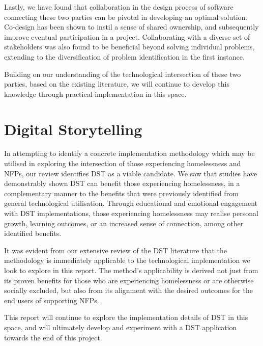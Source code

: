 Lastly, we have found that collaboration in the design process of software connecting these two parties can be pivotal in developing an optimal solution. Co-design has been shown to instil a sense of shared ownership, and subsequently improve eventual participation in a project. Collaborating with a diverse set of stakeholders was also found to be beneficial beyond solving individual problems, extending to the diversification of problem identification in the first instance.

Building on our understanding of the technological intersection of these two parties, based on the existing literature, we will continue to develop this knowledge through practical implementation in this space.

\section{Digital Storytelling}

In attempting to identify a concrete implementation methodology which may be utilised in exploring the intersection of those experiencing homelessness and NFPs, our review identifies DST as a viable candidate. We saw that studies have demonstrably shown DST can benefit those experiencing homelessness, in a complementary manner to the benefits that were previously identified from general technological utilisation. Through educational and emotional engagement with DST implementations, those experiencing homelessness may realise personal growth, learning outcomes, or an increased sense of connection, among other identified benefits.

It was evident from our extensive review of the DST literature that the methodology is immediately applicable to the technological implementation we look to explore in this report. The method's applicability is derived not just from its proven benefits for those who are experiencing homelessness or are otherwise socially excluded, but also from its alignment with the desired outcomes for the end users of supporting NFPs.

This report will continue to explore the implementation details of DST in this space, and will ultimately develop and experiment with a DST application towards the end of this project.